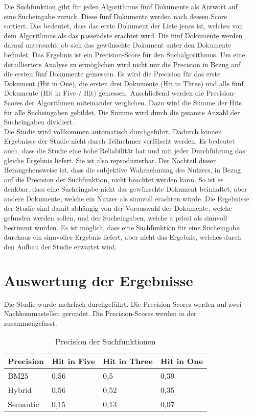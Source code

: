 Die Suchfunktion gibt für jeden Algorithmus fünf Dokumente als Antwort auf eine Sucheingabe zurück.
Diese fünf Dokumente werden nach dessen Score sortiert.
Das bedeutet, dass das erste Dokument der Liste jenes ist, welches von dem Algorithmus als das passendste erachtet wird.
Die fünf Dokumente werden darauf untersucht, ob sich das gewünschte Dokument unter den Dokumente befindet.
Das Ergebnis ist ein Precision-Score für den Suchalgorithmus.
Um eine detailliertere Analyse zu ermöglichen wird nicht nur die Precision in Bezug auf die ersten fünf Dokumente gemessen.
Es wird die Precision für das erste Dokument (Hit in One), die ersten drei Dokumente (Hit in Three) und alle fünf Dokumente (Hit in Five / Hit) gemessen.
Anschließend werden die Precision-Scores der Algorithmen miteinander verglichen.
Dazu wird die Summe der Hits für alle Sucheingaben gebildet.
Die Summe wird durch die gesamte Anzahl der Sucheingaben dividiert.\\

Die Studie wird vollkommen automatisch durchgeführt.
Dadurch können Ergebnisse der Studie nicht durch Teilnehmer verfälscht werden.
Es bedeutet auch, dass die Studie eine hohe Reliabilität hat und mit jeder Durchführung das gleiche Ergebnis liefert.
Sie ist also reproduzierbar.
Der Nachteil dieser Herangehensweise ist, dass die subjektive Wahrnehmung des Nutzers, in Bezug auf die Precision der Suchfunktion, nicht beachtet werden kann.
So ist es denkbar, dass eine Sucheingabe nicht das gewünschte Dokument beinhaltet, aber andere Dokumente, welche ein Nutzer als sinnvoll erachten würde.
Die Ergebnisse der Studie sind damit abhängig von der Vorauswahl der Dokumente, welche gefunden werden sollen, und der Sucheingaben, welche a priori als sinnvoll bestimmt wurden.
Es ist möglich, dass eine Suchfunktion für eine Sucheingabe durchaus ein sinnvolles Ergebnis liefert, aber nicht das Ergebnis, welches durch den Aufbau der Studie erwartet wird.

\section{Auswertung der Ergebnisse}
Die Studie wurde mehrfach durchgeführt.
Die Precision-Scores werden auf zwei Nachkommastellen gerundet.
Die Precision-Scores werden in der  zusammengefasst.

\begin{table}[!ht]
    \centering
    \label{precision-tabelle}
    \begin{tabular}{|l|l|l|l|}
    \hline
        Precision & Hit in Five & Hit in Three & Hit in One \\ \hline
        BM25 & 0,56 & 0,5 & 0,39 \\ \hline
        Hybrid & 0,56 & 0,52 & 0,35 \\ \hline
        Semantic & 0,15 & 0,13 & 0,07 \\ \hline
    \end{tabular}
    \caption[Precision]{Precision der Suchfunktionen}
\end{table}

